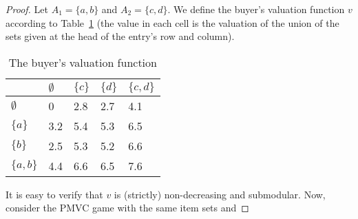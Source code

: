 \begin{proof}
  Let $A_1=\{a,b\}$ and $A_2=\{c,d\}$. We define the buyer's
  valuation function $v$ according to Table~\ref{tab:ce-valuation} (the
  value in each cell is the valuation of the union of the
  sets given at the head of the entry's row and column).


\begin{table}[ht]
\begin{tabular}{@{}lllll@{}}
\toprule
            & $\emptyset$ & $\{c\}$ & $\{d\}$ & $\{c,d\}$ \\ \midrule
$\emptyset$ & 0           & 2.8   & 2.7   & 4.1    \\
$\{a\}$     & 3.2       & 5.4   & 5.3   & 6.5    \\
$\{b\}$     & 2.5       & 5.3   & 5.2   & 6.6    \\
$\{a,b\}$   & 4.4      & 6.6  & 6.5  & 7.6    \\ \bottomrule
\end{tabular}
\caption{The buyer's valuation function}
\label{tab:ce-valuation}
\end{table}
It is easy to verify that $v$ is (strictly) non-decreasing and
submodular. Now, consider the PMVC game with the same item sets and

\end{proof}
